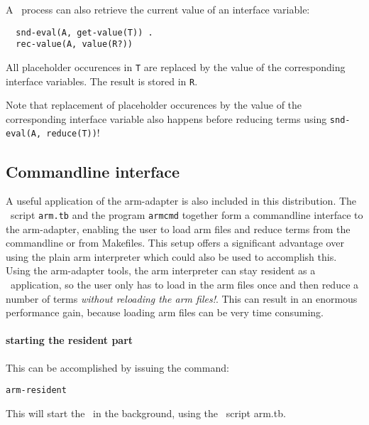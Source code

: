 A \TB\ process can also retrieve the current value of an interface variable:

\begin{verbatim}
  snd-eval(A, get-value(T)) .
  rec-value(A, value(R?))
\end{verbatim}

All placeholder occurences in {\tt T} are replaced by the value
of the corresponding interface variables. The result is stored in {\tt R}.

Note that replacement of placeholder occurences by the value of the
corresponding interface variable also happens before reducing terms
using {\tt snd-eval(A, reduce(T))}!

\subsection{Commandline interface}

A useful application of the arm-adapter is also included in this
distribution. The \TB\ script {\tt arm.tb} and the program {\tt armcmd}
together form a commandline interface to the arm-adapter, enabling
the user to load arm files and reduce terms from the commandline
or from Makefiles. This setup offers a significant advantage over using
the plain arm interpreter which could also be used to accomplish this.
Using the arm-adapter tools, the arm interpreter can stay resident as
a \TB\ application, so the user only has to load in the arm files once
and then reduce a number of terms \emph{without reloading the arm files!}.
This can result in an enormous performance gain, because loading arm files
can be very time consuming.

\paragraph{starting the resident part} This can be
accomplished by issuing the command:
\begin{verbatim}
arm-resident
\end{verbatim}
This will start the \TB\ in the background, using the \TB\ script arm.tb.

